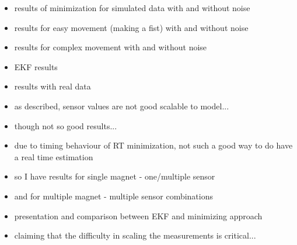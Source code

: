 \begin{itemize}
\item results of minimization for simulated data with and without noise
\item results for easy movement (making a fist) with and without noise
\item results for complex movement with and without noise

\item EKF results

\item results with real data
\item as described, sensor values are not good scalable to model...
\item though not so good results...
\item due to timing behaviour of RT minimization, not such a good way to do have a real time estimation
\item so I have results for single magnet - one/multiple sensor 
\item and for multiple magnet - multiple sensor combinations
\item presentation and comparison between EKF and minimizing approach
\item claiming that the difficulty in scaling the measurements is critical...

\end{itemize}



